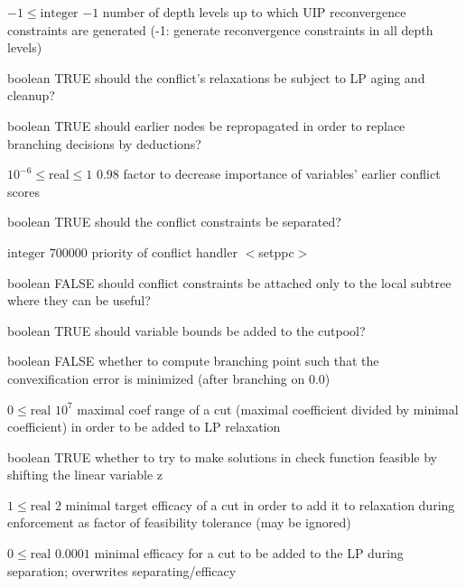 %
{$-1\leq\textrm{integer}$}%
{$-1$}%
{number of depth levels up to which UIP reconvergence constraints are generated (-1: generate reconvergence constraints in all depth levels)}%
{}

%
{boolean}%
{TRUE}%
{should the conflict's relaxations be subject to LP aging and cleanup?}%
{}

%
{boolean}%
{TRUE}%
{should earlier nodes be repropagated in order to replace branching decisions by deductions?}%
{}

%
{$10^{- 6}\leq\textrm{real}\leq1$}%
{$0.98$}%
{factor to decrease importance of variables' earlier conflict scores}%
{}

%
{boolean}%
{TRUE}%
{should the conflict constraints be separated?}%
{}

%
{$\textrm{integer}$}%
{$700000$}%
{priority of conflict handler $<$setppc$>$}%
{}

%
{boolean}%
{FALSE}%
{should conflict constraints be attached only to the local subtree where they can be useful?}%
{}

%
{boolean}%
{TRUE}%
{should variable bounds be added to the cutpool?}%
{}

%
{boolean}%
{FALSE}%
{whether to compute branching point such that the convexification error is minimized (after branching on 0.0)}%
{}

%
{$0\leq\textrm{real}$}%
{$10^{  7}$}%
{maximal coef range of a cut (maximal coefficient divided by minimal coefficient) in order to be added to LP relaxation}%
{}

%
{boolean}%
{TRUE}%
{whether to try to make solutions in check function feasible by shifting the linear variable z}%
{}

%
{$1\leq\textrm{real}$}%
{$2$}%
{minimal target efficacy of a cut in order to add it to relaxation during enforcement as factor of feasibility tolerance (may be ignored)}%
{}

%
{$0\leq\textrm{real}$}%
{$0.0001$}%
{minimal efficacy for a cut to be added to the LP during separation; overwrites separating/efficacy}%
{}

